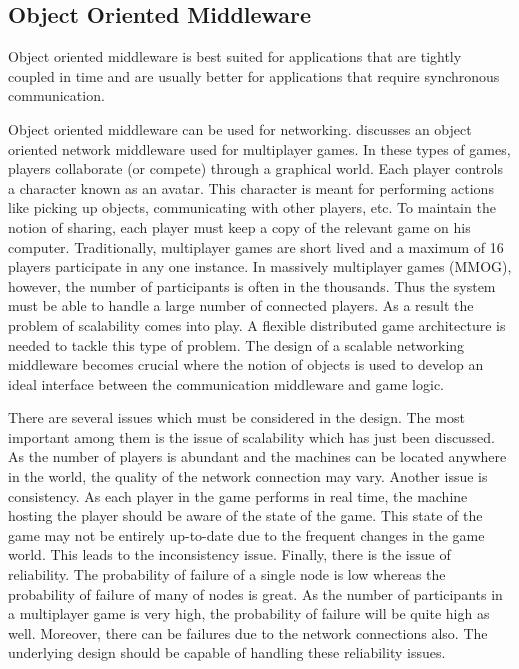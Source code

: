 \documentclass{acm_proc_article-sp}
\begin{document}
\subsection{Object Oriented Middleware}
\label{sec:appsobj}

Object oriented middleware is best suited for applications that are tightly coupled in time and are usually better for applications that require synchronous communication.

Object oriented middleware can be used for networking. \cite{Denault:2008p8364} discusses an object oriented network middleware used for multiplayer games. In these types of games, players collaborate (or compete) through a graphical world. Each player controls a character known as an avatar. This character is meant for performing actions like picking up objects, communicating with other players, etc. To maintain the notion of sharing, each player must keep a copy of the relevant game on his computer. Traditionally, multiplayer games are short lived and a maximum of 16 players participate in any one instance. In massively multiplayer games (MMOG), however, the number of participants is often in the thousands. Thus the system must be able to handle a large number of connected players. As a result the problem of scalability comes into play. A flexible distributed game architecture is needed to tackle this type of problem. The design of a scalable networking middleware becomes crucial where the notion of objects is used to develop an ideal interface between the communication middleware and game logic.

There are several issues which must be considered in the design. The most important among them is the issue of scalability which has just been discussed. As the number of players is abundant and the machines can be located anywhere in the world, the quality of the network connection may vary. Another issue is consistency. As each player in the game performs in real time, the machine hosting the player should be aware of the state of the game. This state of the game may not be entirely up-to-date due to the frequent changes in the game world. This leads to the inconsistency issue. Finally, there is the issue of reliability. The probability of failure of a single node is low whereas the probability of failure of many of nodes is great. As the number of participants in a multiplayer game is very high, the probability of failure will be quite high as well. Moreover, there can be failures due to the network connections also. The underlying design should be capable of handling these reliability issues.
\end{document}
